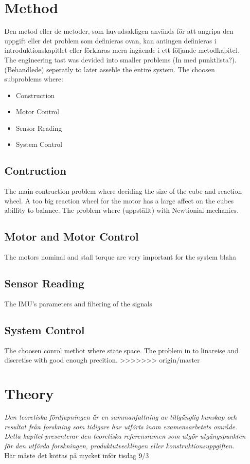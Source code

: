 \documentclass[a4paper,11pt]{kth-mag}
\begin{document}
\chapter{Method}
Den metod eller de metoder, som huvudsakligen används för att angripa den uppgift eller det problem som definieras ovan, kan antingen definieras i introduktionskapitlet eller förklaras mera ingående i ett följande metodkapitel.\\

The engineering tast was devided into smaller problems (In med punktlista?). (Behandlede) seperatly to later asseble the entire system. The choosen subproblems where: 
\begin{itemize}
\item Construction
\item Motor Control
\item Sensor Reading
\item System Control
\end{itemize}

\section{Contruction}
The main contruction problem where deciding the size of the cube and reaction wheel. A too big reaction wheel for the motor has a large affect on the cubes abillity to balance. The problem where (uppställt) with Newtionial mechanics.
 
\section{Motor and Motor Control}
The motors nominal and stall torque are very important for the system blaha
  
\section{Sensor Reading}
The IMU's parameters and filtering of the signals

\section{System Control}
The choosen conrol methot where state space. The problem in to linareise and discretise with good enough precition.
>>>>>>> origin/master


\chapter{Theory}
\emph{Den teoretiska fördjupningen är en sammanfattning av tillgänglig kunskap och resultat från forskning som tidigare har utförts inom examensarbetets område. Detta kapitel presenterar den teoretiska referensramen som utgör utgångspunkten för den utförda forskningen, produktutvecklingen eller konstruktionsuppgiften.}
\\ Här måste det köttas på mycket inför tisdag 9/3 \\
\end{document}
